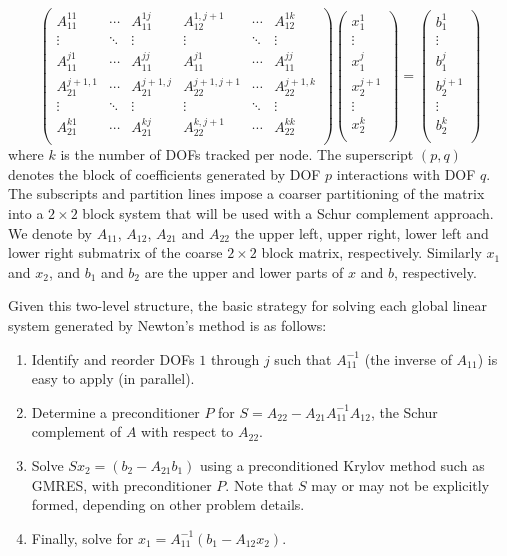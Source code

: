 \documentclass{report}
\begin{document}
$$
\left(
\begin{array}{ccc|ccc} A_{11}^{11} & \cdots & A_{11}^{1j} &
A_{12}^{1,j+1} & \cdots & A_{12}^{1k} \\ \vdots & \ddots &
\vdots & \vdots & \ddots & \vdots \\ A_{11}^{j1} & \cdots &
A_{11}^{jj} & A_{11}^{j1} & \cdots & A_{11}^{jj} \\\hline
A_{21}^{j+1,1} & \cdots & A_{21}^{j+1,j} & A_{22}^{j+1,j+1}
& \cdots & A_{22}^{j+1,k} \\ \vdots & \ddots & \vdots &
\vdots & \ddots & \vdots \\ A_{21}^{k1} & \cdots &
A_{21}^{kj} & A_{22}^{k,j+1} & \cdots & A_{22}^{kk} \\
\end{array} \right) \left( \begin{array}{c} x_1^1 \\ \vdots
\\ x_1^j \\\hline x_2^{j+1} \\ \vdots \\ x_2^k \\
\end{array} \right) = \left( \begin{array}{c} b_1^1 \\
\vdots \\ b_1^j \\\hline b_2^{j+1} \\ \vdots \\ b_2^k \\
\end{array} \right)
$$
where $k$ is the number of DOFs
tracked per node. The superscript $(p, q)$ denotes the block
of coefficients generated by DOF $p$ interactions with DOF
$q$. The subscripts and partition lines impose a coarser
partitioning of the matrix into a $2\times 2$
block system that
will be used with a Schur complement approach. We denote by
$A_{11}$, $A_{12}$, $A_{21}$ and $A_{22}$ the upper left,
upper right, lower left and lower right submatrix of the
coarse $2\times 2$ block matrix, respectively. Similarly $x_1$
and $x_2$, and $b_1$ and $b_2$ are the upper and lower parts
of $x$ and $b$, respectively.

Given this two-level
structure, the basic strategy for solving each global linear
system generated by Newton's method is as follows:
\begin{enumerate}
\item Identify and reorder DOFs $1$
through $j$ such that $A_{11}^{-1}$ (the inverse of
$A_{11}$) is easy to apply (in parallel).
\item Determine a
preconditioner $P$ for $S = A_{22} -
A_{21}A_{11}^{-1}A_{12}$,
the Schur complement of $A$ with
respect to $A_{22}$.
\item Solve $Sx_2 = (b_2 - A_{21}b_1)$
using a preconditioned Krylov method such as GMRES, with
preconditioner $P$. Note that $S$ may or may not be
explicitly formed, depending on other problem details.
\item
Finally, solve for $x_1 = A_{11}^{-1}(b_1 - A_{12}x_2)$.
\end{enumerate}
\end{document}
